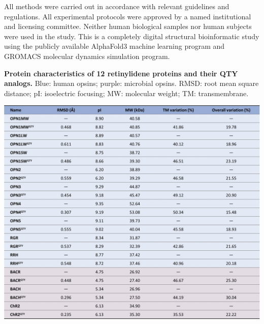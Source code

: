 \documentclass[fleqn, 10pt]{manuscript}
\begin{document}
All methods were carried out in accordance with relevant guidelines and regulations. All experimental protocols were approved by a named institutional and licensing committee. Neither human biological samples nor human subjects were used in the study. This is a completely digital structural bioinformatic study using the publicly available AlphaFold3 machine learning program and GROMACS molecular dynamics simulation program.




\begin{table}[htbp]
	\centering
	\caption{\textbf{Protein characteristics of 12 retinylidene proteins and their QTY analogs. } Blue: human opsins; purple: microbial opsins. RMSD: root mean square distance; pI: isoelectric focusing; MW: molecular weight; TM: transmembrane. }
	\label{tb:characteristics}
	\includegraphics[width=\linewidth]{Figures/characteristics.jpg}
\end{table}
\end{document}
